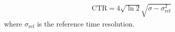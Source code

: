 \begin{align}
\text{CTR} = 4\sqrt{\ln{2}}\sqrt{\sigma-\sigma_\textrm{ref}^2}
\end{align}
\label{ctrfromref}
where $\sigma_\text{ref}$ is the reference time resolution.
